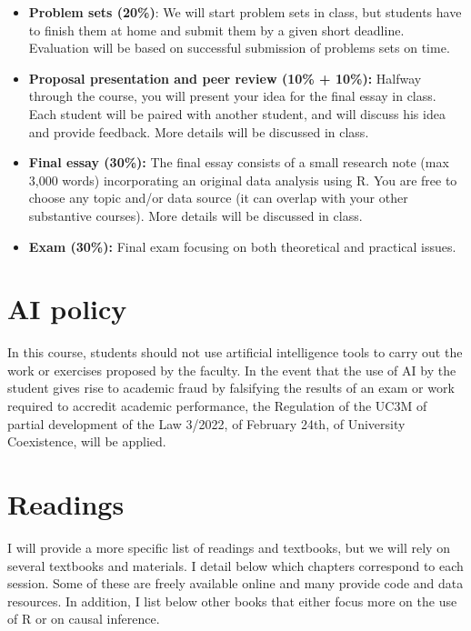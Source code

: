 \documentclass[12pt, a4paper]{article}
\begin{document}
\begin{itemize}
\setlength\itemsep{-5pt}
  \item \textbf{Problem sets (20\%)}: We will start problem sets in class, but students have to finish them at home and submit them by a given short deadline. Evaluation will be based on successful submission of problems sets on time.
  \item \textbf{Proposal presentation and peer review (10\% + 10\%):} Halfway through the course, you will present your idea for the final essay in class. Each student will be paired with another student, and will discuss his idea and provide feedback. More details will be discussed in class.
  \item \textbf{Final essay (30\%):} The final essay consists of a small research note (max 3,000 words) incorporating an original data analysis using R. You are free to choose any topic and/or data source (it can overlap with your other substantive courses). More details will be discussed in class.
  \item \textbf{Exam (30\%):} Final exam focusing on both theoretical and practical issues.
\end{itemize}

\section{AI policy}

In this course, students should not use artificial intelligence tools to carry out the work or exercises proposed by the faculty. In the event that the use of AI by the student gives rise to academic fraud by falsifying the results of an exam or work required to accredit academic performance, the Regulation of the UC3M of partial development of the Law 3/2022, of February 24th, of University Coexistence, will be applied.

\section{Readings}

I will provide a more specific list of readings and textbooks, but we will rely on several textbooks and materials. I detail below which chapters correspond to each session. Some of these are freely available online and many provide code and data resources. In addition, I list below other books that either focus more on the use of R or on causal inference.
\end{document}
